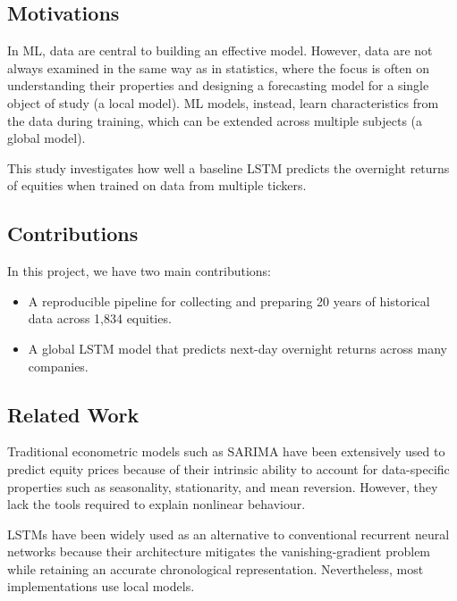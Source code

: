 \documentclass[12pt,a4paper]{article}
\begin{document}
\subsection{Motivations}
In ML, data are central to building an effective model. However, data are not
always examined in the same way as in statistics, where the focus is often on
understanding their properties and designing a forecasting model for a single
object of study (a local model). ML models, instead, learn characteristics from
the data during training, which can be extended across multiple subjects (a global model).

This study investigates how well a baseline LSTM predicts the overnight returns
of equities when trained on data from multiple tickers.

\subsection{Contributions}
In this project, we have two main contributions: 
\begin{itemize}
    \item A reproducible pipeline for collecting and preparing 20 years of historical data across 1,834 equities.
    \item A global LSTM model that predicts next-day overnight returns across many companies.

\end{itemize}

\subsection{Related Work}
Traditional econometric models such as SARIMA \cite{box2015} have been
extensively used to predict equity prices because of their intrinsic ability to
account for data-specific properties such as seasonality, stationarity, and mean
reversion. However, they lack the tools required to explain nonlinear behaviour.

LSTMs \cite{vennerod2021} have been widely used as an alternative to
conventional recurrent neural networks because their architecture mitigates the
vanishing-gradient problem while retaining an accurate chronological
representation. Nevertheless, most implementations use local models.
\end{document}
